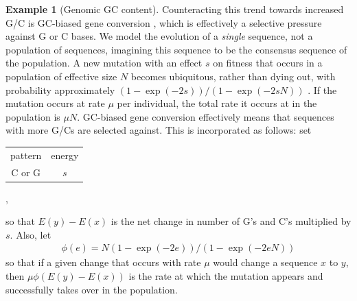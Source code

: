\documentclass{article}
\newcommand{\nC}{\mbox{C}}
\newcommand{\nG}{\mbox{G}}
\theoremstyle{plain}
\theoremstyle{definition}
\newtheorem{example}{Example}[section]
\begin{document}
\begin{example}[Genomic GC content]
    Counteracting this trend towards increased G/C is GC-biased gene conversion \citep{glemin2015quantification},
    which is effectively a selective pressure against G or C bases.
    We model the evolution of a \emph{single} sequence, not a population of sequences,
    imagining this sequence to be the consensus sequence of the population.
    A new mutation with an effect $s$ on fitness that occurs
    in a population of effective size $N$ becomes ubiquitous, rather than dying out,
    with probability approximately $(1-\exp(-2 s))/(1-\exp(-2 s N))$ \citep{kimura1962probability}.
    If the mutation occurs at rate $\mu$ per individual, the total rate it occurs at in the population is $\mu N$.
    GC-biased gene conversion effectively means that sequences with more G/Cs are selected against.
    This is incorporated as follows: set
    \begin{center}
        \begin{tabular}{cc}
        pattern  &  energy \\
        \nC{} or \nG   &  $s$
      \end{tabular} ,
    \end{center}
    so that $E(y)-E(x)$ is the net change in number of G's and C's multiplied by $s$.
    Also, let
    \begin{align*}
        \phi(e) = N (1-\exp(-2e))/(1-\exp(-2eN))
    \end{align*}
    so that if a given change that occurs with rate $\mu$ would change a sequence $x$ to $y$,
    then $\mu \phi(E(y)-E(x))$ is the rate at which the mutation appears and successfully takes over in the population.

\end{example}
\end{document}
